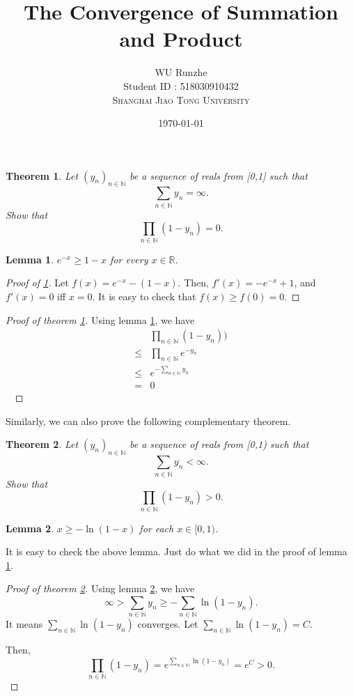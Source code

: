\documentclass[12pt]{article}
\title{The Convergence of Summation and Product}
\author{WU Runzhe\\
	Student ID : 518030910432\\
	\textsc{Shanghai Jiao Tong University}}
\date{\today}
\newcommand\bN{\mathbb{N}}
\newcommand\bR{\mathbb{R}}
\newtheorem{lemma}{Lemma}
\newtheorem{theorem}{Theorem}
\begin{document}
	\maketitle
	
	\begin{tcolorbox}
		\begin{theorem}\label{t1}
			Let $(y_n)_{n\in \bN}$ be a sequence of reals from [0,1] such that $$\sum_{n\in\bN}y_n=\infty.$$ Show that $$\prod_{n\in\bN}(1-y_{n})=0.$$
		\end{theorem}
	\end{tcolorbox}

	\begin{lemma}\label{l1}
		$e^{-x}\ge1-x$ for every $x\in \bR$.
	\end{lemma}
	
	\begin{proof}[Proof of \ref{l1}]
		Let $f(x)=e^{-x}-(1-x)$. Then, $f'(x)=-e^{-x}+1$, and $f'(x)=0$ iff $x=0$. It is easy to check that $f(x)\ge f(0)=0$.
	\end{proof}

	\begin{proof}[Proof of theorem \ref{t1}]

		Using lemma \ref{l1}, we have
		\begin{align*}
			&\prod_{n\in\bN}(1-y_n))\\
			\le& \prod_{n\in\bN} e^{-y_n}\\
			\le& e^{-\sum_{n\in\bN}y_n}\\
			=&0
		\end{align*}\
		
	\end{proof}
	
	Similarly, we can also prove the following complementary theorem.
	
	\begin{tcolorbox}
		\begin{theorem}\label{t2}
			Let $(y_n)_{n\in \bN}$ be a sequence of reals from [0,1) such that $$\sum_{n\in\bN}y_n<\infty.$$ Show that $$\prod_{n\in\bN}(1-y_{n})>0.$$
		\end{theorem}
	\end{tcolorbox}

	\begin{lemma}\label{l2}
		$x\ge -\ln(1-x)$ for each $x\in [0,1)$.
	\end{lemma}
	
	It is easy to check the above lemma. Just do what we did in the proof of lemma \ref{l1}.
	
	\begin{proof}[Proof of theorem \ref{t2}]
		
		Using lemma \ref{l2}, we have
		$$\infty>\sum_{n\in\bN}y_n \ge -\sum_{n\in\bN}\ln(1-y_n).$$
		It means $\sum_{n\in\bN}\ln(1-y_n)$ converges. Let $\sum_{n\in\bN}\ln(1-y_n)=C$.
		
		Then,
		$$\prod_{n\in\bN}(1-y_n)=e^{\sum_{n\in\bN}\ln(1-y_n)}=e^C>0.$$
		
	\end{proof}
	
	
\end{document}
